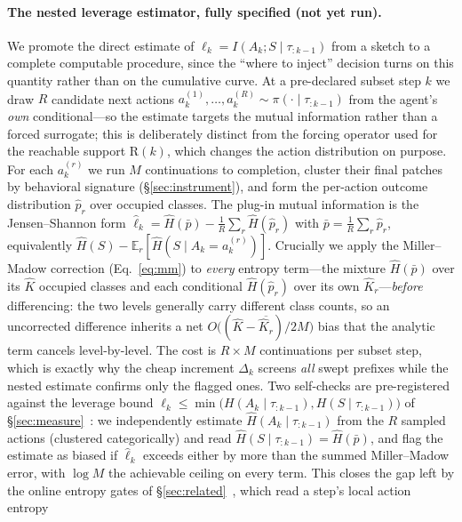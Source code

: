 \documentclass[11pt]{article}
\newcommand{\strat}{S}
\begin{document}
\paragraph{The nested leverage estimator, fully specified (not yet run).}
We promote the direct estimate of $\ell_k=I(A_k;\strat\mid\tau_{:k-1})$ from a
sketch to a complete computable procedure, since the ``where to inject'' decision
turns on this quantity rather than on the cumulative curve. At a pre-declared
subset step $k$ we draw $R$ candidate next actions
$a_k^{(1)},\dots,a_k^{(R)}\sim\pi(\cdot\mid\tau_{:k-1})$ from the agent's \emph{own}
conditional---so the estimate targets the mutual information rather than a forced
surrogate; this is deliberately distinct from the forcing operator used for the
reachable support $\mathrm{R}(k)$, which changes the action distribution on
purpose. For each $a_k^{(r)}$ we run $M$ continuations to completion, cluster their
final patches by behavioral signature (\S\ref{sec:instrument}), and form the
per-action outcome distribution $\hat p_r$ over occupied classes. The plug-in
mutual information is the Jensen--Shannon form
$\widehat\ell_k=\widehat H(\bar p)-\tfrac1R\sum_r \widehat H(\hat p_r)$ with
$\bar p=\tfrac1R\sum_r\hat p_r$, equivalently
$\widehat H(\strat)-\mathbb{E}_r[\widehat H(\strat\mid A_k{=}a_k^{(r)})]$.
Crucially we apply the Miller--Madow correction (Eq.~\eqref{eq:mm}) to
\emph{every} entropy term---the mixture $\widehat H(\bar p)$ over its $\hat K$
occupied classes and each conditional $\widehat H(\hat p_r)$ over its own
$\hat K_r$---\emph{before} differencing: the two levels generally carry different
class counts, so an uncorrected difference inherits a net
$O\!\big((\hat K-\overline{\hat K_r})/2M\big)$ bias that the analytic term cancels
level-by-level. The cost is $R\times M$ continuations per subset step, which is
exactly why the cheap increment $\Delta_k$ screens \emph{all} swept prefixes while
the nested estimate confirms only the flagged ones. Two self-checks are
pre-registered against the leverage bound
$\ell_k\le\min\big(H(A_k\mid\tau_{:k-1}),H(\strat\mid\tau_{:k-1})\big)$ of
\S\ref{sec:measure}~\citep{cover2006elements}: we independently estimate
$\widehat H(A_k\mid\tau_{:k-1})$ from the $R$ sampled actions (clustered
categorically) and read $\widehat H(\strat\mid\tau_{:k-1})=\widehat H(\bar p)$, and
flag the estimate as biased if $\widehat\ell_k$ exceeds either by more than the
summed Miller--Madow error, with $\log M$ the achievable ceiling on every term.
This closes the gap left by the online entropy gates of
\S\ref{sec:related}~\citep{egb2025}, which read a step's local action entropy
\end{document}
